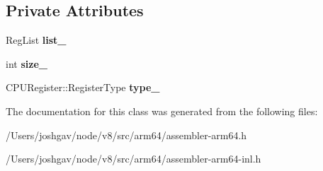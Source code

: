 \subsection*{Private Attributes}
\begin{DoxyCompactItemize}
\item 
Reg\+List {\bfseries list\+\_\+}\hypertarget{classv8_1_1internal_1_1_c_p_u_reg_list_ac3f97fb072e2acecbbb457e5b7669824}{}\label{classv8_1_1internal_1_1_c_p_u_reg_list_ac3f97fb072e2acecbbb457e5b7669824}

\item 
int {\bfseries size\+\_\+}\hypertarget{classv8_1_1internal_1_1_c_p_u_reg_list_a223a94d17b28867f65e77c474bdc566b}{}\label{classv8_1_1internal_1_1_c_p_u_reg_list_a223a94d17b28867f65e77c474bdc566b}

\item 
C\+P\+U\+Register\+::\+Register\+Type {\bfseries type\+\_\+}\hypertarget{classv8_1_1internal_1_1_c_p_u_reg_list_a77c394f96b3a8275ab924bedef4f1890}{}\label{classv8_1_1internal_1_1_c_p_u_reg_list_a77c394f96b3a8275ab924bedef4f1890}

\end{DoxyCompactItemize}


The documentation for this class was generated from the following files\+:\begin{DoxyCompactItemize}
\item 
/\+Users/joshgav/node/v8/src/arm64/assembler-\/arm64.\+h\item 
/\+Users/joshgav/node/v8/src/arm64/assembler-\/arm64-\/inl.\+h\end{DoxyCompactItemize}
